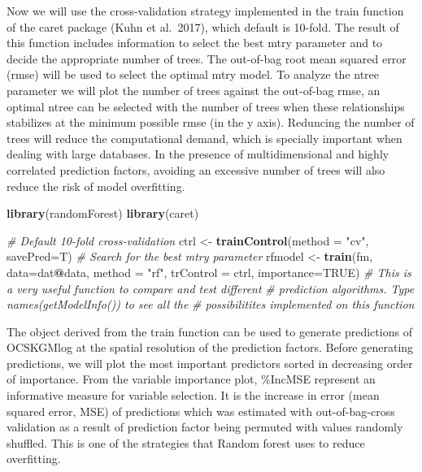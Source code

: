 \documentclass[10pt,b5paper,]{book}
\newenvironment{Shaded}{\begin{snugshade}}{\end{snugshade}}
\newcommand{\CommentTok}[1]{\textcolor[rgb]{0.56,0.35,0.01}{\textit{#1}}}
\newcommand{\DataTypeTok}[1]{\textcolor[rgb]{0.13,0.29,0.53}{#1}}
\newcommand{\KeywordTok}[1]{\textcolor[rgb]{0.13,0.29,0.53}{\textbf{#1}}}
\newcommand{\NormalTok}[1]{#1}
\newcommand{\OperatorTok}[1]{\textcolor[rgb]{0.81,0.36,0.00}{\textbf{#1}}}
\newcommand{\OtherTok}[1]{\textcolor[rgb]{0.56,0.35,0.01}{#1}}
\newcommand{\StringTok}[1]{\textcolor[rgb]{0.31,0.60,0.02}{#1}}
\theoremstyle{definition}
\theoremstyle{definition}
\theoremstyle{definition}
\theoremstyle{remark}
\begin{document}
Now we will use the cross-validation strategy implemented in the train
function of the caret package (Kuhn et al.~2017), which default is
10-fold. The result of this function includes information to select the
best mtry parameter and to decide the appropriate number of trees. The
out-of-bag root mean squared error (rmse) will be used to select the
optimal mtry model. To analyze the ntree parameter we will plot the
number of trees against the out-of-bag rmse, an optimal ntree can be
selected with the number of trees when these relationships stabilizes at
the minimum possible rmse (in the y axis). Reduncing the number of trees
will reduce the computational demand, which is specially important when
dealing with large databases. In the presence of multidimensional and
highly correlated prediction factors, avoiding an excessive number of
trees will also reduce the risk of model overfitting.

\begin{Shaded}
\begin{Highlighting}[]
\KeywordTok{library}\NormalTok{(randomForest)}
\KeywordTok{library}\NormalTok{(caret)}

\CommentTok{# Default 10-fold cross-validation}
\NormalTok{ctrl <-}\StringTok{ }\KeywordTok{trainControl}\NormalTok{(}\DataTypeTok{method =} \StringTok{"cv"}\NormalTok{, }\DataTypeTok{savePred=}\NormalTok{T)}
\CommentTok{# Search for the best mtry parameter}
\NormalTok{rfmodel <-}\StringTok{ }\KeywordTok{train}\NormalTok{(fm, }\DataTypeTok{data=}\NormalTok{dat}\OperatorTok{@}\NormalTok{data, }\DataTypeTok{method =} \StringTok{"rf"}\NormalTok{, }\DataTypeTok{trControl =}\NormalTok{ ctrl, }
             \DataTypeTok{importance=}\OtherTok{TRUE}\NormalTok{)}
\CommentTok{# This is a very useful function to compare and test different }
\CommentTok{# prediction algorithms. Type names(getModelInfo()) to see all the }
\CommentTok{# possibilitites implemented on this function}
\end{Highlighting}
\end{Shaded}

The object derived from the train function can be used to generate
predictions of OCSKGMlog at the spatial resolution of the prediction
factors. Before generating predictions, we will plot the most important
predictors sorted in decreasing order of importance. From the variable
importance plot, \%IncMSE represent an informative measure for variable
selection. It is the increase in error (mean squared error, MSE) of
predictions which was estimated with out-of-bag-cross validation as a
result of prediction factor being permuted with values randomly
shuffled. This is one of the strategies that Random forest uses to
reduce overfitting.
\end{document}
